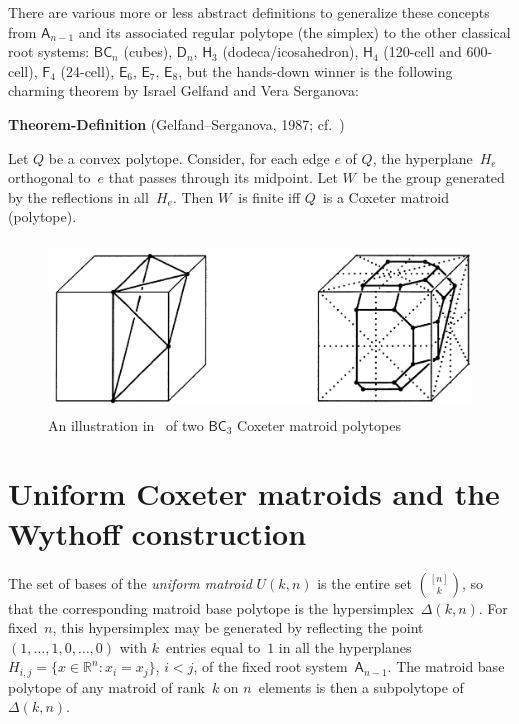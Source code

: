 \documentclass[11pt]{amsart}
\newcommand\RR{{\mathbb R}}
\theoremstyle{definition}
\begin{document}
\medskip There are various more or less abstract definitions to
generalize these concepts from $\mathsf{A}_{n-1}$ and its associated
regular polytope (the simplex) to the other classical root systems:
$\mathsf{BC}_n$ (cubes), $\mathsf{D}_n$, $\mathsf{H}_3$
(dodeca/icosahedron), $\mathsf{H}_4$ (120-cell and 600-cell), $\mathsf{F}_4$
(24-cell), $\mathsf{E}_6$, $\mathsf{E}_7$, $\mathsf{E}_8$, but the
hands-down winner is the following charming theorem by Israel Gelfand
and Vera Serganova:

\medskip
\noindent  \textbf{Theorem-Definition} (Gelfand--Serganova, 1987; cf.~\cite{bgw-2003})

Let $Q$ be a convex polytope. Consider, for each edge $e$ of $Q$, the
hyperplane~$H_e$ orthogonal to~$e$ that passes through its
midpoint. Let $W$~be the group generated by the reflections in
all~$H_e$. Then $W$~is finite iff $Q$~is a Coxeter matroid (polytope).

\begin{figure}[htbp]
  \centering
  \includegraphics[height=4.5cm]{img/cm-polytopes}
\caption{An illustration in~\cite{bgw-2003} of two $\mathsf{BC}_3$ Coxeter matroid polytopes}
\end{figure}


\section{Uniform Coxeter matroids and the Wythoff construction}

The set of bases of the \emph{uniform matroid} $U(k,n)$ is the entire set $\binom{[n]}{k}$, so that the corresponding matroid base polytope is the hypersimplex~$\Delta(k,n)$.
For fixed~$n$, this hypersimplex may be generated by reflecting the point $(1,\dots,1,0,\dots,0)$ with $k$~entries equal to~$1$ in all the hyperplanes $H_{i,j}=\{x\in\RR^n:x_i=x_j\}$, $i<j$, of the fixed root system~$\mathsf{A}_{n-1}$.
The matroid base polytope of any matroid of rank~$k$ on $n$~elements is then a subpolytope of~$\Delta(k,n)$.
\end{document}
